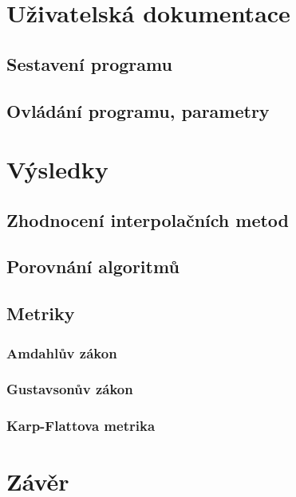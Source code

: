 \documentclass[]{thesiskiv}
\begin{document}
\chapter{Uživatelská dokumentace}

\section{Sestavení programu}

\section{Ovládání programu, parametry}




\chapter{Výsledky}

\section{Zhodnocení interpolačních metod}

\section{Porovnání algoritmů}

\section{Metriky}

\subsection{Amdahlův zákon}

\subsection{Gustavsonův zákon}

\subsection{Karp-Flattova metrika}




\chapter{Závěr}
\end{document}
